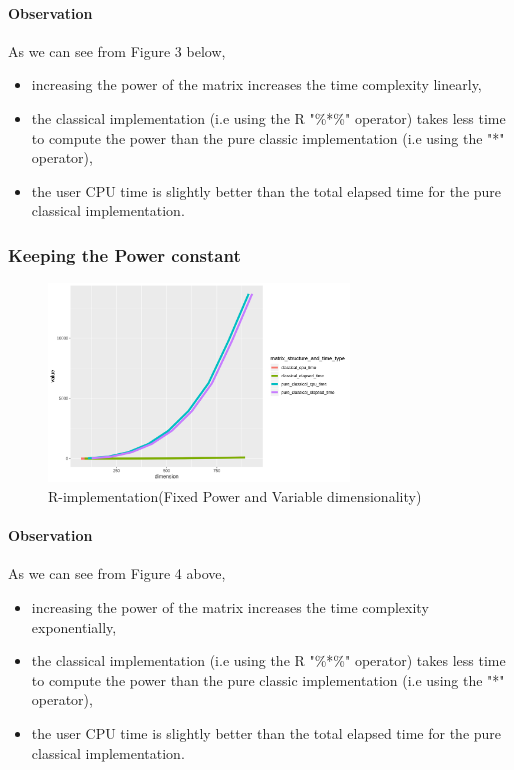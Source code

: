 \documentclass[12pt]{article}
\begin{document}
				\paragraph{Observation}
					As we can see from Figure 3 below, 
					\begin{itemize}
						\item increasing the power of the matrix increases the time complexity linearly,
						\item the classical implementation (i.e using the R "\%*\%" operator) takes less time to compute the power than the pure classic implementation (i.e using the "*" operator),
						\item the user CPU time is slightly better than the total elapsed time for the pure classical implementation.
					\end{itemize}
	\newpage
				
			\subsubsection{Keeping the Power constant}
				\begin{figure}[h]
					\includegraphics[width= 8cm]{../images/R_fixed_power.png}
					\caption{R-implementation(Fixed Power and Variable dimensionality)}
				\end{figure}
				
				\paragraph{Observation}
				As we can see from Figure 4 above, 
				\begin{itemize}
					\item increasing the power of the matrix increases the time complexity exponentially,
					\item the classical implementation (i.e using the R "\%*\%" operator) takes less time to compute the power than the pure classic implementation (i.e using the "*" operator),
					\item the user CPU time is slightly better than the total elapsed time for the pure classical implementation.
				\end{itemize}
\end{document}
